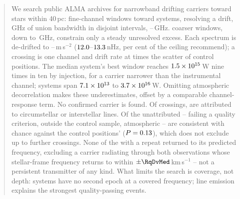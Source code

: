 \begin{abstract}
We search public ALMA archives for narrowband drifting carriers toward
stars within 40\,pc: \NWinA{} fine-channel windows toward \NSysClassA{}
systems, \EdrNWinA{} resolving a drift, \CvUnionA\,GHz of union
bandwidth in \CovNIslands{} disjoint intervals,
\DomAFreqLo--\DomAFreqHi\,GHz. \NWinB{} coarser windows, down to \SurvFreqLo\,GHz,
constrain only a steady unresolved excess. Each spectrum
is de-drifted to \AccelCeilMin--\AccelCeilMax\,m\,s$^{-2}$
($\DriftCeilLo$--$\DriftCeilHi$\,nHz, \AccelSheikhPct{} per cent of the
ceiling \citet{Sheikh2019} recommend); a crossing is one channel and drift
rate at \StageNullTrig{} times the scatter of \NCtrl{} control positions. The median
system's best window reaches $\EirpNinetySysMedA$\,W nine times in ten by
injection, for a carrier narrower than the instrumental channel; systems
span $\EirpNinetySysLoA$ to $\EirpNinetySysHiA$\,W. Omitting
atmospheric decorrelation makes these underestimates, offset by a comparable
channel-response term.
No confirmed carrier is found. Of \EvNCrossRaw{} crossings, \MkAttr{} are
attributed to circumstellar or interstellar lines. Of the \MkUnattr{}
unattributed -- \PrFlagXrossWord{} failing a quality criterion,
\CeNTailCrossWord{} outside the control sample,
\CeTlObsCutWord{} atmospheric -- \CeObs{} are consistent with chance against
the control positions' \CeExp{} ($P=\CeProbNull$), which does not exclude
up to \CeAddLim{} further crossings.
None of the \RcNExclPoss{} with a repeat returned to its predicted
frequency, excluding a carrier radiating through both observations whose
stellar-frame frequency returns to within $\pm\RqDvMed$\,km\,s$^{-1}$ --
not a persistent transmitter of any kind. What limits the search is
coverage, not depth: \ZcNoRepSys{} systems have no second epoch at a
covered frequency; line emission explains the strongest quality-passing
events.
\end{abstract}


